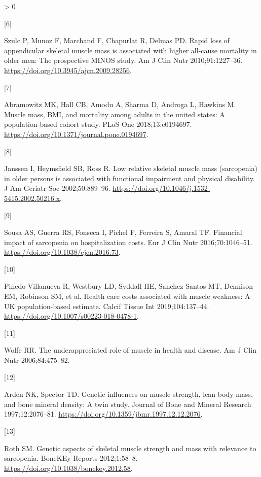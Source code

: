 \documentclass[twoside,10pt]{gihclass} %
\newlength{\cslhangindent}
\newlength{\csllabelwidth}
\newenvironment{CSLReferences}[3] %
 {%
  \setlength{\parindent}{0pt}
  \ifodd #1 \everypar{\setlength{\hangindent}{\cslhangindent}}\ignorespaces\fi
  \ifnum #2 > 0
  \setlength{\parskip}{#2\baselineskip}
  \fi
 }%
 {}
\newcommand{\CSLLeftMargin}[1]{\parbox[t]{\maxof{\widthof{#1}}{\csllabelwidth}}{#1}}
\newcommand{\CSLRightInline}[1]{\parbox[t]{\linewidth}{#1}}
\begin{document}
\begin{CSLReferences}{0}{0}
\leavevmode\hypertarget{ref-RN2515}{}%
\CSLLeftMargin{{[}6{]} }
\CSLRightInline{Szulc P, Munoz F, Marchand F, Chapurlat R, Delmas PD. Rapid loss of appendicular skeletal muscle mass is associated with higher all-cause mortality in older men: The prospective MINOS study. Am J Clin Nutr 2010;91:1227--36. \url{https://doi.org/10.3945/ajcn.2009.28256}.}

\leavevmode\hypertarget{ref-RN2516}{}%
\CSLLeftMargin{{[}7{]} }
\CSLRightInline{Abramowitz MK, Hall CB, Amodu A, Sharma D, Androga L, Hawkins M. Muscle mass, BMI, and mortality among adults in the united states: A population-based cohort study. PLoS One 2018;13:e0194697. \url{https://doi.org/10.1371/journal.pone.0194697}.}

\leavevmode\hypertarget{ref-RN2517}{}%
\CSLLeftMargin{{[}8{]} }
\CSLRightInline{Janssen I, Heymsfield SB, Ross R. Low relative skeletal muscle mass (sarcopenia) in older persons is associated with functional impairment and physical disability. J Am Geriatr Soc 2002;50:889--96. \url{https://doi.org/10.1046/j.1532-5415.2002.50216.x}.}

\leavevmode\hypertarget{ref-RN2532}{}%
\CSLLeftMargin{{[}9{]} }
\CSLRightInline{Sousa AS, Guerra RS, Fonseca I, Pichel F, Ferreira S, Amaral TF. Financial impact of sarcopenia on hospitalization costs. Eur J Clin Nutr 2016;70:1046--51. \url{https://doi.org/10.1038/ejcn.2016.73}.}

\leavevmode\hypertarget{ref-RN2184}{}%
\CSLLeftMargin{{[}10{]} }
\CSLRightInline{Pinedo-Villanueva R, Westbury LD, Syddall HE, Sanchez-Santos MT, Dennison EM, Robinson SM, et al. Health care costs associated with muscle weakness: A UK population-based estimate. Calcif Tissue Int 2019;104:137--44. \url{https://doi.org/10.1007/s00223-018-0478-1}.}

\leavevmode\hypertarget{ref-RN763}{}%
\CSLLeftMargin{{[}11{]} }
\CSLRightInline{Wolfe RR. The underappreciated role of muscle in health and disease. Am J Clin Nutr 2006;84:475--82.}

\leavevmode\hypertarget{ref-RN2526}{}%
\CSLLeftMargin{{[}12{]} }
\CSLRightInline{Arden NK, Spector TD. Genetic influences on muscle strength, lean body mass, and bone mineral density: A twin study. Journal of Bone and Mineral Research 1997;12:2076--81. \url{https://doi.org/10.1359/jbmr.1997.12.12.2076}.}

\leavevmode\hypertarget{ref-RN2527}{}%
\CSLLeftMargin{{[}13{]} }
\CSLRightInline{Roth SM. Genetic aspects of skeletal muscle strength and mass with relevance to sarcopenia. BoneKEy Reports 2012;1:58--8. \url{https://doi.org/10.1038/bonekey.2012.58}.}


\end{CSLReferences}
\end{document}

